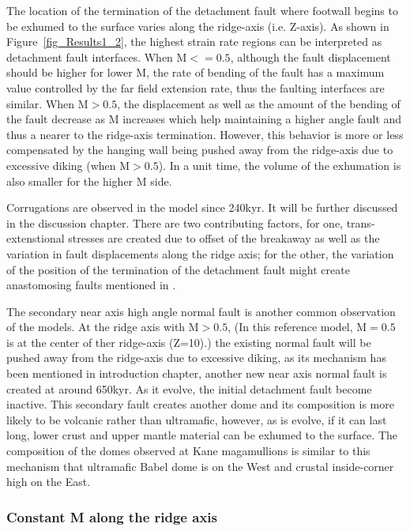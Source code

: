 The location of the termination of the detachment fault where footwall begins to be exhumed to the surface varies along the ridge-axis (i.e. Z-axis). As shown in Figure~\ref{fig_Results1_2}, the highest strain rate regions can be interpreted as detachment fault interfaces. When M$<=0.5$, although the fault displacement should be higher for lower M, the rate of bending of the fault has a maximum value controlled by the far field extension rate, thus the faulting interfaces are similar. When M$>0.5$, the displacement as well as the amount of the bending of the fault decrease as M increases which help maintaining a higher angle fault and thus a nearer to the ridge-axis termination. However, this behavior is more or less compensated by the hanging wall being pushed away from the ridge-axis due to excessive diking (when M$>0.5$). In a unit time, the volume of the exhumation is also smaller for the higher M side.       

Corrugations are observed in the model since 240kyr. It will be further discussed in the discussion chapter. There are two contributing factors, for one, trans-extenstional stresses are created due to offset of the breakaway as well as the variation in fault displacements along the ridge axis; for the other, the variation of the position of the termination of the detachment fault might create anastomosing faults mentioned in \citep{Smith2014}.      

The secondary near axis high angle normal fault is another common observation of the models. At the ridge axis with M$>0.5$, (In this reference model, M$=0.5$ is at the center of ther ridge-axis (Z=10).) the existing normal fault will be pushed away from the ridge-axis due to excessive diking, as its mechanism has been mentioned in introduction chapter, another new near axis normal fault is created at around 650kyr. As it evolve, the initial detachment fault become inactive. This secondary fault creates another dome and its composition is more likely to be volcanic rather than ultramafic, however, as is evolve, if it can last long, lower crust and upper mantle material can be exhumed to the surface. The composition of the domes observed at Kane magamullions is similar to this mechanism that ultramafic Babel dome is on the West and crustal inside-corner high on the East.    

\subsubsection{Constant M along the ridge axis }

